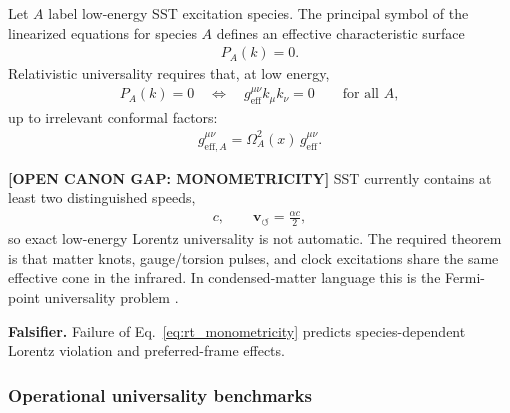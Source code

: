 Let \(A\) label low-energy SST excitation species. The principal symbol of the
linearized equations for species \(A\) defines an effective characteristic
surface
\begin{align}
    P_A(k)=0 .
\end{align}
Relativistic universality requires that, at low energy,
\begin{align}
    P_A(k)=0
    \quad\Longleftrightarrow\quad
    g_{\mathrm{eff}}^{\mu\nu} k_\mu k_\nu=0
    \qquad
    \text{for all } A ,
    \label{eq:rt_monometricity}
\end{align}
up to irrelevant conformal factors:
\begin{align}
    g^{\mu\nu}_{\mathrm{eff},A}
    =
    \Omega_A^2(x)\,
    g^{\mu\nu}_{\mathrm{eff}} .
\end{align}

\textbf{[OPEN CANON GAP: MONOMETRICITY]} SST currently contains at least two
distinguished speeds,
\begin{align}
    c,
    \qquad
    \mathbf{v}_{\!\boldsymbol{\circlearrowleft}}
    =
    \frac{\alpha c}{2},
\end{align}
so exact low-energy Lorentz universality is not automatic. The required theorem
is that matter knots, gauge/torsion pulses, and clock excitations share the
same effective cone in the infrared. In condensed-matter language this is the
Fermi-point universality problem \cite{Volovik2003}.

\textbf{Falsifier.} Failure of Eq.~\eqref{eq:rt_monometricity} predicts
species-dependent Lorentz violation and preferred-frame effects.

\subsubsection{Operational universality benchmarks}


